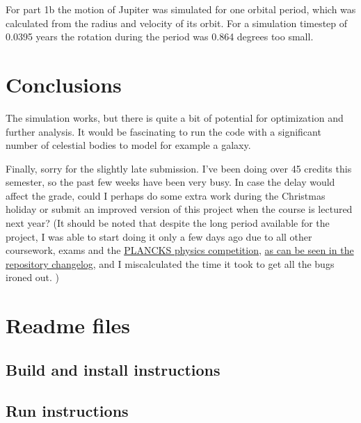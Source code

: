 \documentclass[a4paper]{article}
\begin{document}
For part 1b the motion of Jupiter was simulated for one orbital period, which was calculated from the radius and velocity of its orbit.
For a simulation timestep of 0.0395 years the rotation during the period was 0.864 degrees too small.


\FloatBarrier
\section{Conclusions}
The simulation works, but there is quite a bit of potential for optimization and further analysis.
It would be fascinating to run the code with a significant number of celestial bodies to model for example a galaxy.

Finally, sorry for the slightly late submission.
I've been doing over 45 credits this semester, so the past few weeks have been very busy.
In case the delay would affect the grade, could I perhaps do
some extra work during the Christmas holiday or submit an improved version of this project
when the course is lectured next year?
(It should be noted that despite the long period available for the project, I was able to start doing it only
a few days ago due to all other coursework, exams and the
\href{https://www.plancks.uk/london2020}{PLANCKS physics competition},
\href{https://github.com/AgenttiX/planetary-motion/commits/main}{as can be seen in the repository changelog},
and I miscalculated the time it took to get all the bugs ironed out.
)

\appendix
\clearpage
\section{Readme files}
\label{readmes}
\subsection{Build and install instructions}

\clearpage
\subsection{Run instructions}
\end{document}
